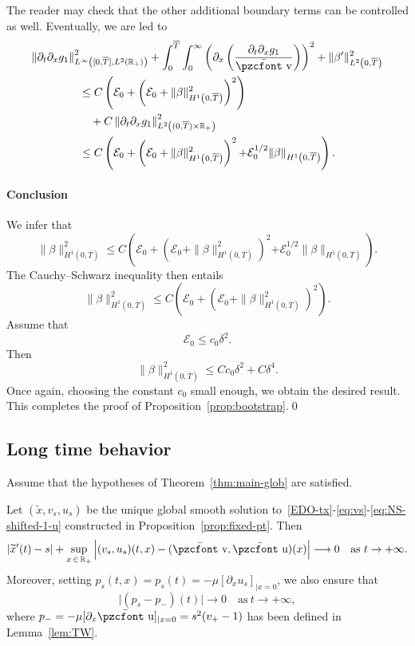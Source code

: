 \documentclass[10pt]{amsart}
\theoremstyle{definition}\newtheorem{defi}[theo]{Definition}\newtheorem{rema}[theo]{Remark}\newtheorem{exam}[theo]{Example}\newtheorem{exem}[theo]{Example}\newtheorem{nota}[theo]{Notation}
\newcommand{\mathpzc}[1]{\text{\pzcfont #1}}
\newcommand{\R}{\mathbb{R}}
\newcommand{\p}{\partial}
\newcommand{\bv}{\bar{\mathpzc{v}}}
\newcommand{\bu}{\bar{\mathpzc{u}}}
\newcommand{\cE}{\mathcal E}
\newcommand{\tx}{\widetilde{x}}
\begin{document}
The reader may check that the other additional boundary terms can be controlled as well. Eventually, we are led to
\begin{multline*}
\left\| \p_t \p_x g_1\right\|_{L^\infty\left([0,\overline{T}], L^2(\R_+)\right)}^2 + \int_0^{\overline{T}} \int_0^\infty \left(\p_x \left(\frac{\p_t \p_x g_1}{\bv}\right) \right)^2 + \|\beta'\|_{L^2\left(0, \overline{T}\right)}^2\\
\begin{aligned}
&\leq C\left(\cE_0 + \left(\cE_0+ \|\beta\|_{H^1\left(0,\overline{T}\right)}^2\right)^2 \right)\\
&\quad + C \left\|\p_t\p_x g_1\right\|_{L^2\left((0,\overline{T})\times \R_+\right)}^2\\
&\leq C \left(\cE_0 + \left(\cE_0 + \|\beta\|_{H^1\left(0,\overline{T}\right)}^2\right)^2 {+ \cE_0^{1/2} \|\beta\|_{H^1\left(0,\overline{T}\right)}}
\right).
\end{aligned}
\end{multline*}


\paragraph{Conclusion}

We infer that
\[
\|\beta\|_{H^1\left(0,\overline{T}\right)}^2 \leq C \left(\cE_0+ \left(\cE_0 + \|\beta\|_{H^1\left(0,\overline{T}\right)}^2\right)^2 {+ \cE_0^{1/2} \|\beta\|_{H^1\left(0,\overline{T}\right)}}
\right).
\]
The Cauchy--Schwarz inequality then entails
\[
\|\beta\|_{H^1\left(0,\overline{T}\right)}^2 \leq C \left(\cE_0+ \left(\cE_0 + \|\beta\|_{H^1\left(0,\overline{T}\right)}^2\right)^2
\right).
\]
Assume that
\[
\cE_0\leq c_0 \delta^2.
\]
Then
\[
\|\beta\|_{H^1\left(0,\overline{T}\right)}^2 \leq C c_0 \delta^2 + C \delta^4.
\]
Once again, choosing the constant $c_0$ small enough, we obtain the desired result. This completes the proof of Proposition~\ref{prop:bootstrap}.\qed

\subsection{Long time behavior}\label{ssec:stability}

\begin{coro}
Assume that the hypotheses of Theorem~\ref{thm:main-glob} are satisfied.

Let $(\tx, v_s,u_s)$ be the unique global smooth solution to~\eqref{EDO-tx}-\eqref{eq:vs}-\eqref{eq:NS-shifted-1-u} constructed in Proposition~\ref{prop:fixed-pt}. Then
\begin{equation}
\left|\tx'(t) - s\right| + \sup_{x\,\in\,\R_+} \Big| (v_s,u_s)(t,x) - (\bv, \bu)(x) \Big| \longrightarrow 0 \quad \text{as}~t \to +\infty.
\end{equation}
Moreover, setting $p_s(t,x) = p_s(t) = -\mu [\partial_x u_s]_{|x=0}$, we also ensure that
\begin{equation*}
\big|(p_s - p_-)(t)\big| \longrightarrow 0 \quad \text{as}~t \to +\infty,
\end{equation*}
where $p_- = -\mu [\partial_x \bu]_{|x=0} = s^2(v_+-1)$ has been defined in Lemma~\ref{lem:TW}.
\end{coro}
\end{document}

